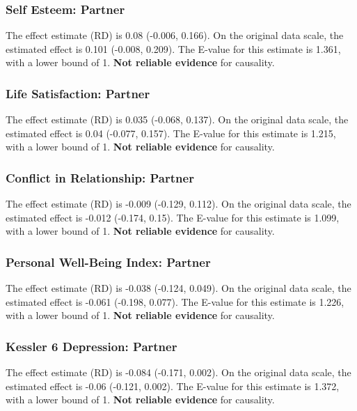 \documentclass[
  singlecolumn]{article}
\begin{document}
\subsubsection{Self Esteem: Partner}\label{self-esteem-partner-13}

The effect estimate (RD) is 0.08 (-0.006, 0.166). On the original data
scale, the estimated effect is 0.101 (-0.008, 0.209). The E-value for
this estimate is 1.361, with a lower bound of 1. \textbf{Not reliable
evidence} for causality.

\subsubsection{Life Satisfaction:
Partner}\label{life-satisfaction-partner-13}

The effect estimate (RD) is 0.035 (-0.068, 0.137). On the original data
scale, the estimated effect is 0.04 (-0.077, 0.157). The E-value for
this estimate is 1.215, with a lower bound of 1. \textbf{Not reliable
evidence} for causality.

\subsubsection{Conflict in Relationship:
Partner}\label{conflict-in-relationship-partner-13}

The effect estimate (RD) is -0.009 (-0.129, 0.112). On the original data
scale, the estimated effect is -0.012 (-0.174, 0.15). The E-value for
this estimate is 1.099, with a lower bound of 1. \textbf{Not reliable
evidence} for causality.

\subsubsection{Personal Well-Being Index:
Partner}\label{personal-well-being-index-partner-13}

The effect estimate (RD) is -0.038 (-0.124, 0.049). On the original data
scale, the estimated effect is -0.061 (-0.198, 0.077). The E-value for
this estimate is 1.226, with a lower bound of 1. \textbf{Not reliable
evidence} for causality.

\subsubsection{Kessler 6 Depression:
Partner}\label{kessler-6-depression-partner-13}

The effect estimate (RD) is -0.084 (-0.171, 0.002). On the original data
scale, the estimated effect is -0.06 (-0.121, 0.002). The E-value for
this estimate is 1.372, with a lower bound of 1. \textbf{Not reliable
evidence} for causality.
\end{document}
